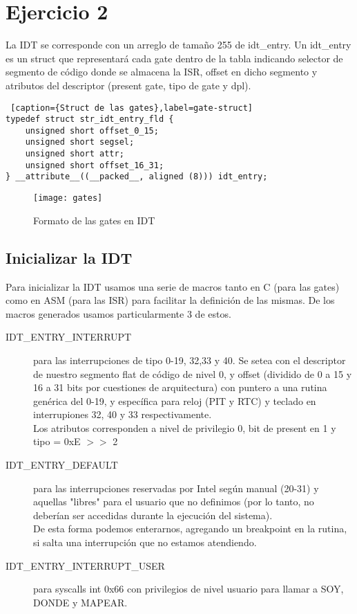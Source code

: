 \section{Ejercicio 2}

La IDT se corresponde con un arreglo de tamaño 255 de idt_entry. Un idt_entry es un struct que representará cada gate dentro de la tabla indicando selector de segmento de código donde se almacena la ISR, offset en dicho segmento y atributos del descriptor (present gate, tipo de gate y dpl). 

\begin{lstlisting} [caption={Struct de las gates},label=gate-struct]
typedef struct str_idt_entry_fld {
    unsigned short offset_0_15;
    unsigned short segsel;
    unsigned short attr;
    unsigned short offset_16_31;
} __attribute__((__packed__, aligned (8))) idt_entry;
\end{lstlisting}

\begin{figure}[H]
    \centering
    \texttt{[image: gates]}
    \caption{Formato de las gates en IDT}
    \label{fig:gates}
\end{figure}



\subsection{Inicializar la IDT}

Para inicializar la IDT usamos una serie de macros tanto en C (para las gates) como en ASM (para las ISR) para facilitar la definición de las mismas.
De los macros generados usamos particularmente 3 de estos.
\begin{description}
\item [IDT_ENTRY_INTERRUPT] para las interrupciones de tipo 0-19, 32,33 y 40. Se setea con el descriptor de nuestro segmento flat de código de nivel 0, y offset (dividido de 0 a 15 y 16 a 31 bits por cuestiones de arquitectura) con puntero a una rutina genérica del 0-19, y específica para reloj (PIT y RTC) y teclado en interrupiones 32, 40 y 33 respectivamente. \\
Los atributos corresponden a nivel de privilegio 0, bit de present en 1 y tipo = 0xE $>>$ 2
\item [IDT_ENTRY_DEFAULT] para las interrupciones reservadas por Intel según manual (20-31) y aquellas "libres" para el usuario que no definimos (por lo tanto, no deberían ser accedidas durante la ejecución del sistema). \\
De esta forma podemos enterarnos, agregando un breakpoint en la rutina, si salta una interrupción que no estamos atendiendo.
\item [IDT_ENTRY_INTERRUPT_USER] para syscalls int 0x66 con privilegios de nivel usuario para llamar a SOY, DONDE y MAPEAR.
\end{description} 

